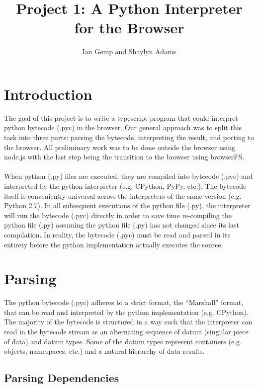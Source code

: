 \documentclass{article}
\begin{document}
\title{Project 1: A Python Interpreter for the Browser}
\author{Ian Gemp and Shaylyn Adams}
\maketitle

\section{Introduction}
The goal of this project is to write a typescript program that could interpret python bytecode (.pyc) in the browser.  Our general approach was to split this task into three parts: parsing the bytecode, interpreting the result, and porting to the browser.  All preliminary work was to be done outside the browser using node.js with the last step being the transition to the browser using browserFS.\\
\\
When python (.py) files are executed, they are compiled into bytecode (.pyc) and interpreted by the python interpreter (e.g. CPython, PyPy, etc.).  The bytecode itself is conveniently universal across the interpreters of the same version (e.g. Python 2.7).  In all subsequent executions of the python file (.py), the interpreter will run the bytecode (.pyc) directly in order to save time re-compiling the python file (.py) assuming the python file (.py) has not changed since its last compilation.  In reality, the bytecode (.pyc) must be read and parsed in its entirety before the python implementation actually executes the source.

\section{Parsing}

The python bytecode (.pyc) adheres to a strict format, the ``Marshall'' format, that can be read and interpreted by the python implementation (e.g. CPython).  The majority of the bytecode is structured in a way such that the interpreter can read in the bytecode stream as an alternating sequence of datum (singular piece of data) and datum types.  Some of the datum types represent containers (e.g. objects, namespaces, etc.) and a natural hierarchy of data results.

\subsection{Parsing Dependencies}
\end{document}
